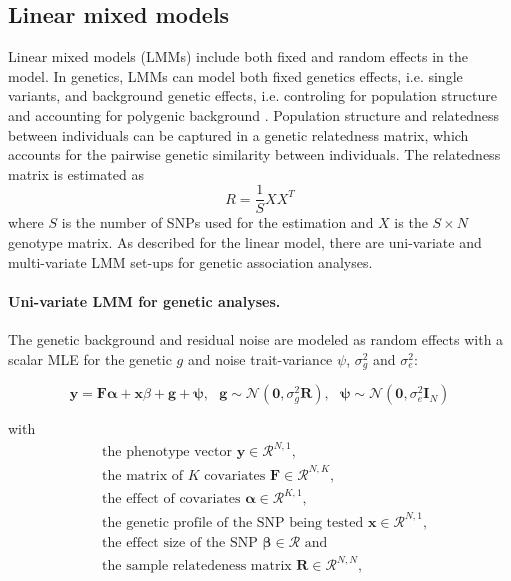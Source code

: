 \subsection{Linear mixed models}
Linear mixed models (LMMs) include both fixed and random effects in the model. In genetics, LMMs can model both fixed genetics effects, i.e. single variants, and background genetic effects, i.e. controling for population structure and accounting for polygenic background \citep{Yu2006}. Population structure and relatedness between individuals can be captured in a genetic relatedness matrix, which accounts for the pairwise genetic similarity between individuals. The relatedness matrix is estimated as
 \begin{equation}
 R = \frac{1}{S}XX^T
 \label{eq:relatedness}
 \end{equation}
 where \(S\) is the number of SNPs used for the estimation and \(X\) is the \(S \times N\) genotype matrix. As described for the linear model, there are uni-variate and multi-variate LMM set-ups for genetic association analyses. 


\paragraph{Uni-variate LMM for genetic analyses.} The genetic background and residual noise are modeled as random effects with a scalar MLE for the genetic \(g\) and noise trait-variance \(\psi\),   \(\sigma_g^2\) and \(\sigma_e^2\):

\begin{equation}
\mathbf{y} = \mathbf{F}\boldsymbol{\alpha} + \mathbf{x}\beta + \mathbf{g}+\boldsymbol{\psi},\text{ }
\mathbf{g}\sim\mathcal{N}\left(\mathbf{0},\sigma_g^2\mathbf{R}\right),\text{ }
\mathbf{\psi}\sim\mathcal{N}\left(\mathbf{0},\sigma_e^2\mathbf{I}_N\right)
\label{eq:lmm-uv}
\end{equation}

with
\begin{align*} 
& \text{the phenotype vector } \mathbf{y} \in \mathcal{R}^{N,1},\\
& \text{the matrix of $K$ covariates } \mathbf{F} \in \mathcal{R}^{N,K},\\
& \text{the effect of covariates } \boldsymbol{\alpha} \in \mathcal{R}^{K,1},\\
& \text{the genetic profile of the SNP being tested } \mathbf{x} \in \mathcal{R}^{N,1},\\
& \text{the effect size of the SNP } \boldsymbol{\beta} \in \mathcal{R} \text{ and}\\
& \text{the sample relatedeness matrix } \mathbf{R} \in \mathcal{R}^{N,N},
\end{align*} 

